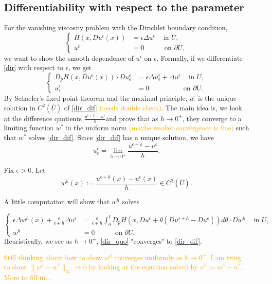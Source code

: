 \documentclass[11pt,reqno]{amsart}
\numberwithin{figure}{section}
\theoremstyle{plain}
\theoremstyle{remark}
\numberwithin{equation}{section}
\begin{document}
\begin{appendices}
\section{Differentiability with respect to the parameter}
For the vanishing viscosity problem with the Dirichlet boundary condition,
\begin{equation}
\label{dir}
\left\{
  \begin{aligned}
    H(x, Du^\epsilon(x)) &= \epsilon \Delta u^\epsilon \quad \, \text{in } U, \\
              u^\epsilon &= 0 \quad \qquad \text{on } \partial U,
  \end{aligned}
\right.
\end{equation}
we want to show the smooth dependence of $u^\epsilon$ on $\epsilon$.
Formally, if we differentiate \eqref{dir} with respect to $\epsilon$, we get
\begin{equation}
\label{dir_dif}
\left\{
  \begin{aligned}
    D_pH(x, Du^\epsilon(x))\cdot Du^\epsilon_\epsilon &= \epsilon \Delta u^\epsilon_\epsilon +\Delta u^\epsilon \quad \, \text{in } U, \\
              u^\epsilon_\epsilon &= 0 \quad \qquad  \qquad  \text{on } \partial U.
  \end{aligned}
\right.
\end{equation}
By Schaefer's fixed point theorem and the maximal principle, $u^\epsilon_\epsilon$ is the unique solution in $C^2(\overline{U})$ of \eqref{dir_dif} \textcolor{orange}{(needs double check)}. The main idea is, we look at the difference quotients $\displaystyle \frac{u^{\epsilon+h}-u^\epsilon}{h}$and prove that as $h \to 0^+$, they converge to a limiting function $w^{\ast}$ in the uniform norm \textcolor{orange}{(maybe weaker convergence is fine)} such that $w^{\ast}$ solves \eqref{dir_dif}. Since \eqref{dir_dif} has a unique solution, we have $$u^\epsilon_\epsilon=\lim_{h \to 0^+}\frac{u^{\epsilon+h}-u^\epsilon}{h}.$$

Fix $\epsilon >0$. Let $$w^h(x):=\frac{u^{\epsilon+h}(x)-u^\epsilon(x)}{h} \in C^2(\overline{U}).$$

A little computation will show that $w^h$ solves

\begin{equation}
\label{dir_quo}
\left\{
  \begin{aligned}
   \epsilon \Delta w^h(x) + \frac{\epsilon}{\epsilon + h}\Delta u^\epsilon &= \frac{\epsilon}{\epsilon +h} \int_0^1 D_pH(x, Du^\epsilon+\theta (Du^{\epsilon+h}-Du^\epsilon)) d\theta \cdot Dw^h \quad \, \text{in } U, \\
              w^h &= 0 \quad \qquad \text{on } \partial U.
  \end{aligned}
\right.
\end{equation}
Heuristically, we see as $h \to 0^+$, \eqref{dir_quo} "converges" to \eqref{dir_dif}.


\textcolor{orange}{Still thinking about how to show $w^h$ converges uniformly as $h \to 0^+$. I am tring to show $\| w^h-w^\ast\|_\infty \to 0$ by looking at the equation solved by $v^h:=w^h-w^\ast$. More to fill in...}

\end{appendices}
\end{document}
